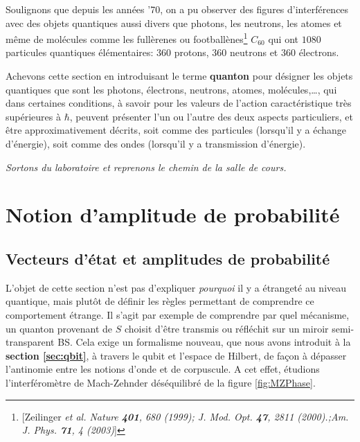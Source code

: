 Soulignons que depuis les années '70, on a pu observer des figures
d'interférences avec des objets quantiques aussi divers que photons, les
neutrons, les atomes et même de molécules comme les fullèrenes ou
footballènes\footnote{[Zeilinger \emph{et al. Nature
\textbf{401}, 680 (1999); J. Mod. Opt. \textbf{47}, 2811 (2000).;Am. J. Phys.
\textbf{71}, 4 (2003)}]} $C_{60}$ qui ont $1080$ particules quantiques
élémentaires: $360$ protons,
$360$ neutrons et $360$ électrons.

Achevons cette section en introduisant le terme \textbf{quanton} pour désigner
les objets quantiques que sont les photons, électrons, neutrons, atomes,
molécules,\ldots, qui dans certaines conditions, à savoir pour les valeurs de
l'action caractéristique très supérieures à $\hbar$, peuvent présenter l'un ou
l'autre des deux aspects particuliers, et être approximativement décrits, soit
comme des particules (lorsqu'il y a échange d'énergie), soit comme des ondes
(lorsqu'il y a transmission d'énergie).

\bigskip
\emph{Sortons du laboratoire et reprenons le chemin de la salle de cours.}

\section{Notion d'amplitude de probabilité}
\label{sec:AmplProba}

\subsection{Vecteurs d'état et amplitudes de probabilité}

L'objet de cette section n'est pas d'expliquer \emph{pourquoi} il y a étrangeté
au niveau quantique, mais plutôt de définir les règles permettant de comprendre
ce comportement étrange. Il s'agit par exemple de comprendre par quel mécanisme,
un quanton provenant de $S$ choisit d'être transmis ou réfléchit sur un miroir
semi-transparent BS.  Cela exige un formalisme nouveau, que nous avons introduit
à la \textbf{section \ref{sec:qbit}}, à travers le qubit et l'espace de Hilbert,
de façon à dépasser l'antinomie entre les notions d'onde et de corpuscule. A cet
effet, étudions l'interféromètre de Mach-Zehnder déséquilibré de la figure
\ref{fig:MZPhase}.

